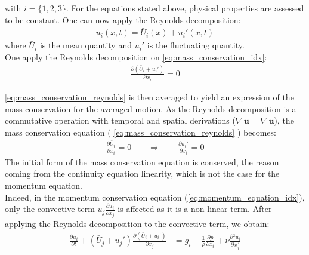 \documentclass[12pt,twoside]{report}
\renewcommand \pd[2] { \frac{\partial {#1} } {\partial {#2}} }
\newcommand{\Autoref}[1]{%
  \begingroup%
    \def\chapterautorefname{Chapter}%
    \def\sectionautorefname{Section}%
    \def\subsectionautorefname{Subsection}%
    \def\subsubsectionautorefname{Subsubsection}%
    \def\paragraphautorefname{Paragraph}%
    \def\tableautorefname{Table}%
    \def\equationautorefname{Equation}%
    \def\algorithmautorefname{Algorithm}%
    \def\lineautorefname{Step}%
  \autoref{#1}%
  \endgroup%
}
\begin{document}
with $i=\{1,2,3\}$. For the equations stated above, physical properties are assessed to be constant. One can now apply the Reynolds decomposition:
\begin{align}
    u_i(x,t) = \bar{U}_i(x) + u_i'(x,t) \label{eq:reynolds_decomposition}
\end{align}
where $\bar{U}_i$ is the mean quantity and $u_i'$ is the fluctuating quantity. \\

One apply the Reynolds decomposition on \autoref{eq:mass_conservation_idx}:
\begin{align}
    \pd{\left( \bar{U}_i + u_i' \right)}{x_i} =0 \label{eq:mass_conservation_reynolds}
\end{align}

\autoref{eq:mass_conservation_reynolds} is then averaged to yield an expression of the mass conservation for the averaged motion. As the Reynolds decomposition is a commutative operation with temporal and spatial derivations ($\overline{\nabla \, \mathbf{u}} = \nabla \, \bar{\mathbf{u}}$), the mass conservation equation (\Autoref{eq:mass_conservation_reynolds}) becomes:
\begin{align}
    \pd{\bar{U}_i}{x_i} = 0 \qquad \Longrightarrow \qquad \pd{u_i'}{x_i} = 0\label{eq:mass_conservation_reynolds_averaged}
\end{align}
The initial form of the mass conservation equation is conserved, the reason coming from the continuity equation linearity, which is not the case for the momentum equation. \\

Indeed, in the momentum conservation equation (\autoref{eq:momentum_equation_idx}), only the convective term $u_j \pd{u_i}{x_j}$ is affected as it is a non-linear term. After applying the Reynolds decomposition to the convective term, we obtain:
\begin{align}
    \pd{u_i}{t} + \left(\bar{U}_j + u_j'\right) \pd{\left(\bar{U}_i+u_i'\right)}{x_j}  &= g_i - \frac{1}{\rho} \pd{p}{x_i} + \nu \pd{^2 u_i}{x_j^2} \label{eq:momentum_equation_reynolds_decompo}
\end{align}
\end{document}
